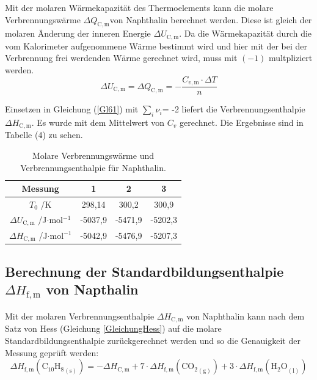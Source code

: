 \documentclass[12pt,a4paper,titlepage,headinclude,bibtotoc]{scrartcl}
\begin{document}
Mit der molaren Wärmekapazität des Thermoelements kann die molare Verbrennungswärme $\Delta Q_{\mathrm{C,m}}$von Naphthalin berechnet werden. Diese ist gleich der molaren Änderung der inneren Energie $\Delta U_\mathrm{C,m}$. Da die Wärmekapazität durch die vom Kalorimeter aufgenommene Wärme bestimmt wird und hier mit der bei der Verbrennung frei werdenden Wärme gerechnet wird, muss mit $(-1)$ multpliziert werden.\\

\begin{equation}
\Delta U_\mathrm{C,m}= \Delta Q_\mathrm{C,m}= - \frac{C_{v,\mathrm{m}}\cdot \Delta T}{n}
\end{equation}

Einsetzen in Gleichung (\ref{Gl61}) mit $\sum_i \nu_i$= -2 liefert die Verbrennungsenthalpie $\Delta H_\mathrm{C,m}$. Es wurde mit dem Mittelwert von $C_v$ gerechnet. Die Ergebnisse sind in Tabelle (4)
 zu sehen.\\

\begin{table}[ht!]\centering 
\caption{Molare Verbrennungswärme und Verbrennungsenthalpie für Naphthalin.}  \label{Endergebnisse}
\begin{tabular}{c|c|c|c}
Messung & 1 & 2 & 3 \\ 
\hline 
$T_0$ /K &298,14&300,2&300,9\\
\hline 
$\Delta U_\mathrm{C,m}$ /J$\cdot$mol$^{-1}$ 
&-5037,9&-5471,9&-5202,3\\
\hline 
$\Delta H_\mathrm{C,m}$ /J$\cdot$mol$^{-1}$ 
&-5042,9&-5476,9&-5207,3\\
\end{tabular} 
\end{table}
\FloatBarrier

\subsection{Berechnung der Standardbildungsenthalpie $\Delta H_\mathrm{f,m}$ von Napthalin}

Mit der molaren Verbrennungsenthalpie $\Delta H_\mathrm{C,m}$ von Naphthalin kann nach dem Satz von Hess (Gleichung \ref{GleichungHess}) auf die molare Standardbildungsenthalpie zurückgerechnet werden und so die Genauigkeit der Messung geprüft werden:\\

\begin{equation}
\Delta H_\mathrm{f,m}({\mathrm{C}_{10}\mathrm{H}_8}_\mathrm{(s)}) = -\Delta H_\mathrm{C,m} +7\cdot \Delta H_\mathrm{f,m}({\mathrm{CO}_2}_\mathrm{(g)}) + 3\cdot \Delta H_\mathrm{f,m}({\mathrm{H}_2\mathrm{O}}_\mathrm{(l)}) 
\end{equation}
\end{document}
